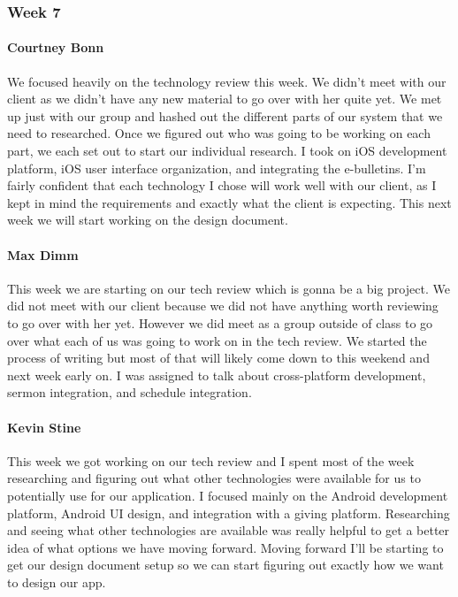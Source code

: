 		\subsubsection{Week 7}
		
			\paragraph{Courtney Bonn}
			We focused heavily on the technology review this week. We didn't meet with our client as we didn't have any new material to go over with her quite yet. We met up just with our group and hashed out the different parts of our system that we need to researched. Once we figured out who was going to be working on each part, we each set out to start our individual research. I took on iOS development platform, iOS user interface organization, and integrating the e-bulletins. I'm fairly confident that each technology I chose will work well with our client, as I kept in mind the requirements and exactly what the client is expecting. This next week we will start working on the design document.

			\paragraph{Max Dimm}
			This week we are starting on our tech review which is gonna be a big project. We did not meet with our client because we did not have anything worth reviewing to go over with her yet. However we did meet as a group outside of class to go over what each of us was going to work on in the tech review. We started the process of writing but most of that will likely come down to this weekend and next week early on. I was assigned to talk about cross-platform development, sermon integration, and schedule integration.
			
			\paragraph{Kevin Stine}
			This week we got working on our tech review and I spent most of the week researching and figuring out what other technologies were available for us to potentially use for our application. I focused mainly on the Android development platform, Android UI design, and integration with a giving platform. Researching and seeing what other technologies are available was really helpful to get a better idea of what options we have moving forward. Moving forward I'll be starting to get our design document setup so we can start figuring out exactly how we want to design our app.
			
